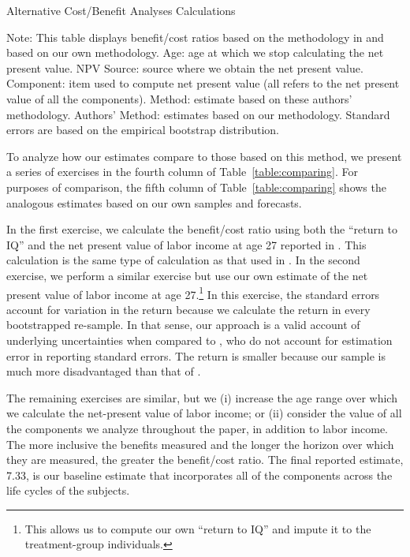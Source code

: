\begin{table}[!htbp]
\begin{threeparttable}
\caption{Alternative Cost/Benefit Analyses Calculations}
\label{table:comparing}
\centering
\footnotesize

\begin{tablenotes}
\footnotesize
\item Note: This table displays benefit/cost ratios based on the methodology in \citet{Kline_Walters_2016_QJE} and based on our own methodology. Age: age at which we stop calculating the net present value. NPV Source: source where we obtain the net present value. Component: item used to compute net present value (all refers to the net present value of all the components). \citet{Kline_Walters_2016_QJE} Method: estimate based on these authors' methodology. Authors' Method: estimates based on our methodology. Standard errors are based on the empirical bootstrap distribution.
\end{tablenotes}
\end{threeparttable}
\end{table}

To analyze how our estimates compare to those based on this method, we present a series of exercises in the fourth column of Table~\ref{table:comparing}. For purposes of comparison, the fifth column of Table~\ref{table:comparing} shows the analogous estimates based on our own samples and forecasts.

In the first exercise, we calculate the benefit/cost ratio using both the ``return to IQ'' and the net present value of labor income at age 27 reported in \citet{Chetty_Friedman_etal_2011_QJoE}. This calculation is the same type of calculation as that used in \citet{Kline_Walters_2016_QJE}. In the second exercise, we perform a similar exercise but use our own estimate of the net present value of labor income at age 27.\footnote{This allows us to compute our own ``return to IQ'' and impute it to the treatment-group individuals.} In this exercise, the standard errors account for variation in the return because we calculate the return in every bootstrapped re-sample. In that sense, our approach is a valid account of underlying uncertainties when compared to \citet{Kline_Walters_2016_QJE}, who do not account for estimation error in reporting standard errors. The return is smaller because our sample is much more disadvantaged than that of \citet{Chetty_Friedman_etal_2011_QJoE}.

The remaining exercises are similar, but we (i) increase the age range over which we calculate the net-present value of labor income; or (ii) consider the value of all the components we analyze throughout the paper, in addition to labor income. The more inclusive the benefits measured and the longer the horizon over which they are measured, the greater the benefit/cost ratio. The final reported estimate, 7.33, is our baseline estimate that incorporates all of the components across the life cycles of the subjects.

